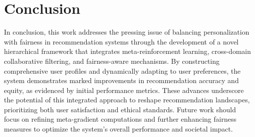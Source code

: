 \section{Conclusion}

In conclusion, this work addresses the pressing issue of balancing personalization with fairness in recommendation systems through the development of a novel hierarchical framework that integrates meta-reinforcement learning, cross-domain collaborative filtering, and fairness-aware mechanisms. By constructing comprehensive user profiles and dynamically adapting to user preferences, the system demonstrates marked improvements in recommendation accuracy and equity, as evidenced by initial performance metrics. These advances underscore the potential of this integrated approach to reshape recommendation landscapes, prioritizing both user satisfaction and ethical standards. Future work should focus on refining meta-gradient computations and further enhancing fairness measures to optimize the system's overall performance and societal impact.
